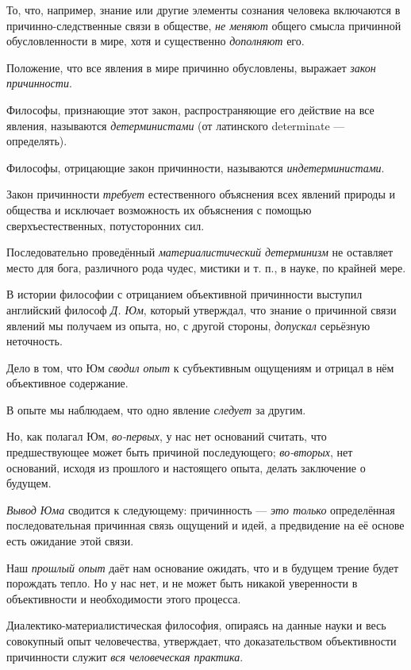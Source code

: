 \documentclass[a4paper,14pt,russian]{extreport}
\begin{document}
То, что, например, знание или другие элементы сознания человека включаются в причинно-следственные связи в обществе, \emph{не меняют} общего смысла причинной обусловленности в мире, хотя и существенно \emph{дополняют} его.

Положение, что все явления в мире причинно обусловлены, выражает \emph{закон причинности}.

Философы, признающие этот закон, распространяющие его действие на все явления, называются \emph{детерминистами} (от латинского determinate --- определять).

Философы, отрицающие закон причинности, называются \emph{индетерминистами}.

Закон причинности \emph{требует} естественного объяснения всех явлений природы и общества и исключает возможность их объяснения с помощью сверхъестественных, потусторонних сил.

Последовательно проведённый \emph{материалистический детерминизм} не оставляет место для бога, различного рода чудес, мистики и т. п., в науке, по крайней мере.

В истории философии с отрицанием объективной причинности выступил английский философ \emph{Д. Юм}, который утверждал, что знание о причинной связи явлений мы получаем из опыта, но, с другой стороны, \emph{допускал} серьёзную неточность.

Дело в том, что Юм \emph{сводил опыт} к субъективным ощущениям и отрицал в нём объективное содержание.

В опыте мы наблюдаем, что одно явление \emph{следует} за другим.

Но, как полагал Юм, \emph{во-первых}, у нас нет оснований считать, что предшествующее может быть причиной последующего; \emph{во-вторых}, нет оснований, исходя из прошлого и настоящего опыта, делать заключение о будущем.

\emph{Вывод Юма} сводится к следующему: причинность --- \emph{это только} определённая последовательная причинная связь ощущений и идей, а предвидение на её основе есть ожидание этой связи.

Наш \emph{прошлый опыт} даёт нам основание ожидать, что и в будущем трение будет порождать тепло. Но у нас нет, и не может быть никакой уверенности в объективности и необходимости этого процесса.

Диалектико-материалистическая философия, опираясь на данные науки и весь совокупный опыт человечества, утверждает, что доказательством объективности причинности служит \emph{вся человеческая практика}.
\end{document}
